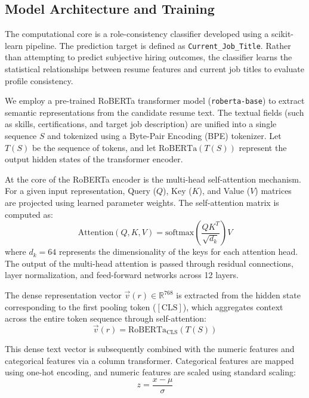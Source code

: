 \documentclass[sigconf]{acmart}
\begin{document}
\subsection{Model Architecture and Training}
The computational core is a role-consistency classifier developed using a scikit-learn pipeline. The prediction target is defined as \texttt{Current\_Job\_Title}. Rather than attempting to predict subjective hiring outcomes, the classifier learns the statistical relationships between resume features and current job titles to evaluate profile consistency.

We employ a pre-trained RoBERTa transformer model (\texttt{roberta-base}) to extract semantic representations from the candidate resume text. The textual fields (such as skills, certifications, and target job description) are unified into a single sequence $S$ and tokenized using a Byte-Pair Encoding (BPE) tokenizer. Let $T(S)$ be the sequence of tokens, and let $\text{RoBERTa}(T(S))$ represent the output hidden states of the transformer encoder. 

At the core of the RoBERTa encoder is the multi-head self-attention mechanism. For a given input representation, Query ($Q$), Key ($K$), and Value ($V$) matrices are projected using learned parameter weights. The self-attention matrix is computed as:
\begin{equation}
\text{Attention}(Q, K, V) = \text{softmax}\left(\frac{QK^T}{\sqrt{d_k}}\right)V
\end{equation}
where $d_k = 64$ represents the dimensionality of the keys for each attention head. The output of the multi-head attention is passed through residual connections, layer normalization, and feed-forward networks across 12 layers. 

The dense representation vector $\vec{v}(r) \in \mathbb{R}^{768}$ is extracted from the hidden state corresponding to the first pooling token ($[\text{CLS}]$), which aggregates context across the entire token sequence through self-attention:
\begin{equation}
\vec{v}(r) = \text{RoBERTa}_{\text{CLS}}(T(S))
\end{equation}

This dense text vector is subsequently combined with the numeric features and categorical features via a column transformer. Categorical features are mapped using one-hot encoding, and numeric features are scaled using standard scaling:
\begin{equation}
z = \frac{x - \mu}{\sigma}
\end{equation}
\end{document}
